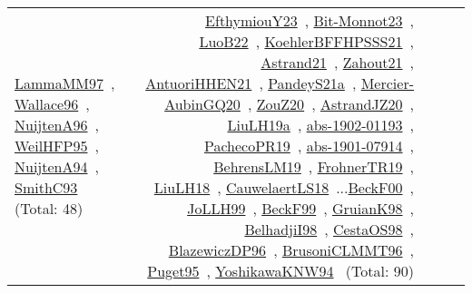 {\begin{longtable}{p{3cm}r>{\raggedright\arraybackslash}p{6cm}>{\raggedright\arraybackslash}p{6cm}>{\raggedright\arraybackslash}p{8cm}}
\href{../works/LammaMM97.pdf}{LammaMM97}~\cite{LammaMM97}, \href{../works/Wallace96.pdf}{Wallace96}~\cite{Wallace96}, \href{../works/NuijtenA96.pdf}{NuijtenA96}~\cite{NuijtenA96}, \href{../works/WeilHFP95.pdf}{WeilHFP95}~\cite{WeilHFP95}, \href{../works/NuijtenA94.pdf}{NuijtenA94}~\cite{NuijtenA94}, \href{../works/SmithC93.pdf}{SmithC93}~\cite{SmithC93} (Total: 48) & \href{../works/EfthymiouY23.pdf}{EfthymiouY23}~\cite{EfthymiouY23}, \href{../works/Bit-Monnot23.pdf}{Bit-Monnot23}~\cite{Bit-Monnot23}, \href{../works/LuoB22.pdf}{LuoB22}~\cite{LuoB22}, \href{../works/KoehlerBFFHPSSS21.pdf}{KoehlerBFFHPSSS21}~\cite{KoehlerBFFHPSSS21}, \href{../works/Astrand21.pdf}{Astrand21}~\cite{Astrand21}, \href{../works/Zahout21.pdf}{Zahout21}~\cite{Zahout21}, \href{../works/AntuoriHHEN21.pdf}{AntuoriHHEN21}~\cite{AntuoriHHEN21}, \href{../works/PandeyS21a.pdf}{PandeyS21a}~\cite{PandeyS21a}, \href{../works/Mercier-AubinGQ20.pdf}{Mercier-AubinGQ20}~\cite{Mercier-AubinGQ20}, \href{../works/ZouZ20.pdf}{ZouZ20}~\cite{ZouZ20}, \href{../works/AstrandJZ20.pdf}{AstrandJZ20}~\cite{AstrandJZ20}, \href{../works/LiuLH19a.pdf}{LiuLH19a}~\cite{LiuLH19a}, \href{../works/abs-1902-01193.pdf}{abs-1902-01193}~\cite{abs-1902-01193}, \href{../works/PachecoPR19.pdf}{PachecoPR19}~\cite{PachecoPR19}, \href{../works/abs-1901-07914.pdf}{abs-1901-07914}~\cite{abs-1901-07914}, \href{../works/BehrensLM19.pdf}{BehrensLM19}~\cite{BehrensLM19}, \href{../works/FrohnerTR19.pdf}{FrohnerTR19}~\cite{FrohnerTR19}, \href{../works/LiuLH18.pdf}{LiuLH18}~\cite{LiuLH18}, \href{../works/CauwelaertLS18.pdf}{CauwelaertLS18}~\cite{CauwelaertLS18}...\href{../works/BeckF00.pdf}{BeckF00}~\cite{BeckF00}, \href{../works/JoLLH99.pdf}{JoLLH99}~\cite{JoLLH99}, \href{../works/BeckF99.pdf}{BeckF99}~\cite{BeckF99}, \href{../works/GruianK98.pdf}{GruianK98}~\cite{GruianK98}, \href{../works/BelhadjiI98.pdf}{BelhadjiI98}~\cite{BelhadjiI98}, \href{../works/CestaOS98.pdf}{CestaOS98}~\cite{CestaOS98}, \href{../works/BlazewiczDP96.pdf}{BlazewiczDP96}~\cite{BlazewiczDP96}, \href{../works/BrusoniCLMMT96.pdf}{BrusoniCLMMT96}~\cite{BrusoniCLMMT96}, \href{../works/Puget95.pdf}{Puget95}~\cite{Puget95}, \href{../works/YoshikawaKNW94.pdf}{YoshikawaKNW94}~\cite{YoshikawaKNW94} (Total: 90)\\

\end{longtable}}
